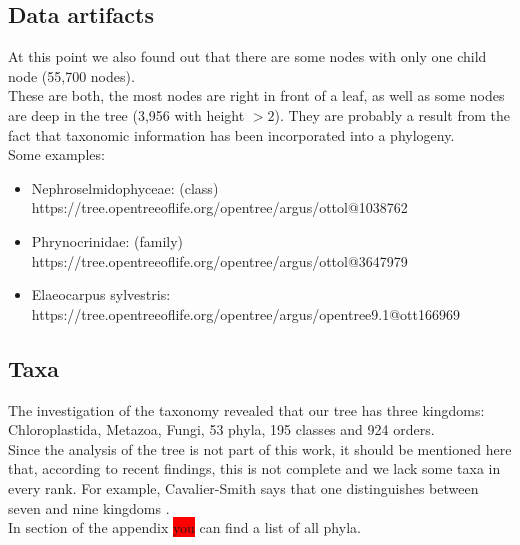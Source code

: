     \subsection{Data artifacts}
      At this point we also found out that there are some nodes with only one child node (55,700 nodes). \\
      These are both, the most nodes are right in front of a leaf, as well as some nodes are deep in the 
        tree (3,956 with height $>2$). They are probably a result from the fact that taxonomic information 
        has been incorporated into a phylogeny. \\
      Some examples:
      \begin{itemize}
        \item Nephroselmidophyceae: (class) \\
          https://tree.opentreeoflife.org/opentree/argus/ottol@1038762
        \item Phrynocrinidae: (family) \\
          https://tree.opentreeoflife.org/opentree/argus/ottol@3647979
        \item Elaeocarpus sylvestris: \\
          https://tree.opentreeoflife.org/opentree/argus/opentree9.1@ott166969
      \end{itemize}

    \subsection{Taxa}
      The investigation of the taxonomy revealed that our tree has three kingdoms: Chloroplastida, 
        Metazoa, Fungi, 53 phyla, 195 classes and 924 orders. \\
      Since the analysis of the tree is not part of this work, it should be mentioned here that, 
        according to recent findings, this is not complete and we lack some taxa in every rank. For 
        example, Cavalier-Smith says that one distinguishes between seven and nine kingdoms 
        \cite{CavalierSmith1981}. \\
      In section \pageref{subsec:listPhyla} of the appendix \colorbox{red}{you} can find a list of all phyla.

